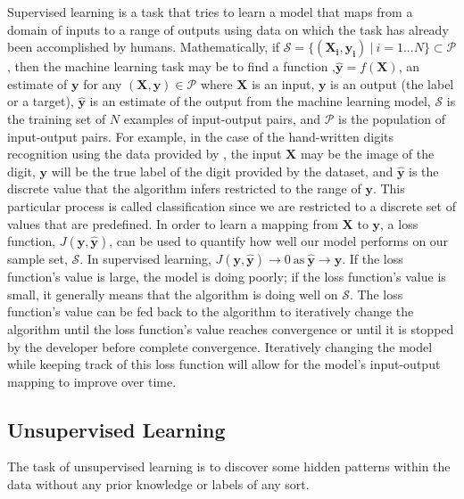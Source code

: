 Supervised learning is a task that tries to learn a model that maps from a domain of inputs to a range of outputs using data on which the task has already been accomplished by humans. Mathematically, if $\mathcal{S} =\{ ( \mathbf{X_i}, \mathbf{y_i} ) \ | \ i = 1...N\} \subset \mathcal{P}$, then the machine learning task may be to find a function ,$ \mathbf{\hat{y}} = f(\mathbf{X}) $, an estimate of $\mathbf{y}$ for any $(\mathbf{X}, \mathbf{y}) \in \mathcal{P}$ where $\mathbf{X}$ is an input, $\mathbf{y}$ is an output (the label or a target), $\mathbf{\hat{y}}$  is an estimate of the output from the machine learning model, $\mathcal{S}$ is the training set of $N$ examples of input-output pairs, and $\mathcal{P}$ is the population of input-output pairs. For example, in the case of the hand-written digits recognition using the data provided by \citet{lecun1998mnist}, the input $\mathbf{X}$ may be the image of the digit, $\mathbf{y}$ will be the true label of the digit provided by the dataset, and $\mathbf{\hat{y}}$ is the discrete value that the algorithm infers restricted to the range of $\mathbf{y}$. This particular process is called classification since we are restricted to a discrete set of values that are predefined. In order to learn a mapping from $\mathbf{X}$ to $\mathbf{y}$, a loss function, $J(\mathbf{y}, \mathbf{\hat{y}})$, can be used to quantify how well our model performs on our sample set, $\mathcal{S}$. In supervised learning, $J(\mathbf{y}, \mathbf{\hat{y}}) \rightarrow 0 \ \text{as} \ \mathbf{\hat{y}} \rightarrow \mathbf{y}$. If the loss function's value is large, the model is doing poorly; if the loss function's value is small, it generally means that the algorithm is doing well on $\mathcal{S}$. The loss function's value can be fed back to the algorithm to iteratively change the algorithm until the loss function's value reaches convergence or until it is stopped by the developer before complete convergence. Iteratively changing the model while keeping track of this loss function will allow for the model's input-output mapping to improve over time. 

\subsection{Unsupervised Learning}

The task of unsupervised learning is to discover some hidden patterns within the data without any prior knowledge or labels of any sort. 

